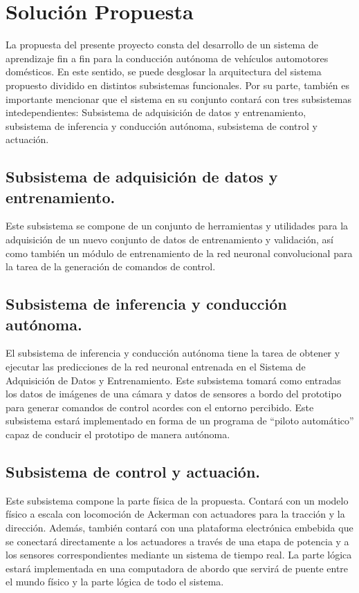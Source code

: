 \documentclass[12pt,letterpaper]{article}
\begin{document}
\section{Solución Propuesta}

La propuesta del presente proyecto consta del desarrollo de un sistema de aprendizaje
fin a fin para la conducción autónoma de vehículos automotores domésticos. En este
sentido, se puede desglosar la arquitectura del sistema propuesto dividido en 
distintos subsistemas funcionales.
Por su parte, también es importante mencionar que el sistema en su conjunto contará 
con tres subsistemas intedependientes: Subsistema de adquisición de datos y 
entrenamiento, subsistema de inferencia y conducción autónoma, subsistema de control 
y actuación.

\subsection{Subsistema de adquisición de datos y entrenamiento.}
Este subsistema se compone de un conjunto de herramientas y utilidades para la 
adquisición de un nuevo conjunto de datos de entrenamiento y validación, así como
también un módulo de entrenamiento de la red neuronal convolucional para la tarea de
la generación de comandos de control.

\subsection{Subsistema de inferencia y conducción autónoma.}
El subsistema de inferencia y conducción autónoma tiene la tarea de obtener y ejecutar
las predicciones de la red neuronal entrenada en el Sistema de Adquisición de Datos y Entrenamiento.
Este subsistema tomará como entradas los datos de imágenes de una cámara y datos de 
sensores a bordo del prototipo para generar comandos de control acordes con el entorno
percibido. Este subsistema estará implementado en forma de un programa de ``piloto automático''
capaz de conducir el prototipo de manera autónoma.

\subsection{Subsistema de control y actuación.}
Este subsistema compone la parte física de la propuesta. Contará con un modelo físico
a escala con locomoción de Ackerman con actuadores para la tracción y la dirección. 
Además, también contará con una plataforma electrónica embebida que se conectará 
directamente a los actuadores a través de una etapa de potencia y a los sensores 
correspondientes mediante un sistema de tiempo real. La parte lógica estará implementada
en una computadora de abordo que servirá de puente entre el mundo físico y la parte 
lógica de todo el sistema.
\end{document}
